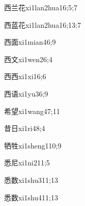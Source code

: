 \begin{verbete}{西兰花}{xi1lan2hua1}{6;5;7}
\end{verbete}

\begin{verbete}{西蓝花}{xi1lan2hua1}{6;13;7}
\end{verbete}

\begin{verbete}{西面}{xi1mian4}{6;9}
\end{verbete}

\begin{verbete}{西文}{xi1wen2}{6;4}
\end{verbete}

\begin{verbete}{西西}{xi1xi1}{6;6}
\end{verbete}

\begin{verbete}{西语}{xi1yu3}{6;9}
\end{verbete}

\begin{verbete}{希望}{xi1wang4}{7;11}
\end{verbete}

\begin{verbete}{昔日}{xi1ri4}{8;4}
\end{verbete}

\begin{verbete}{牺牲}{xi1sheng1}{10;9}
\end{verbete}

\begin{verbete}{悉尼}{xi1ni2}{11;5}
\end{verbete}

\begin{verbete}{悉数}{xi1shu3}{11;13}
\end{verbete}

\begin{verbete}{悉数}{xi1shu4}{11;13}
\end{verbete}

